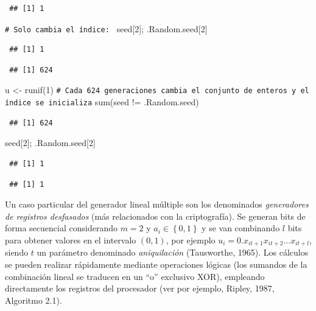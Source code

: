 \documentclass[
]{book}
\newenvironment{Shaded}{\begin{snugshade}}{\end{snugshade}}
\newcommand{\CommentTok}[1]{\textcolor[rgb]{0.56,0.35,0.01}{\textit{#1}}}
\newcommand{\DecValTok}[1]{\textcolor[rgb]{0.00,0.00,0.81}{#1}}
\newcommand{\FunctionTok}[1]{\textcolor[rgb]{0.00,0.00,0.00}{#1}}
\newcommand{\NormalTok}[1]{#1}
\newcommand{\OtherTok}[1]{\textcolor[rgb]{0.56,0.35,0.01}{#1}}
\newcommand{\SpecialCharTok}[1]{\textcolor[rgb]{0.00,0.00,0.00}{#1}}
\theoremstyle{break}
\theoremstyle{nonumberplain}
\renewcommand{\CommentTok}[1]{\textcolor[rgb]{0.41,0.41,0.41}{\texttt{#1}}}
\begin{document}
\begin{verbatim}
 ## [1] 1
\end{verbatim}

\begin{Shaded}
\begin{Highlighting}[]
\CommentTok{\# Solo cambia el índice: }
\NormalTok{seed[}\DecValTok{2}\NormalTok{]; .Random.seed[}\DecValTok{2}\NormalTok{]}
\end{Highlighting}
\end{Shaded}

\begin{verbatim}
 ## [1] 1
\end{verbatim}

\begin{verbatim}
 ## [1] 624
\end{verbatim}

\begin{Shaded}
\begin{Highlighting}[]
\NormalTok{u }\OtherTok{\textless{}{-}} \FunctionTok{runif}\NormalTok{(}\DecValTok{1}\NormalTok{)}
\CommentTok{\# Cada 624 generaciones cambia el conjunto de enteros y el índice se inicializa}
\FunctionTok{sum}\NormalTok{(seed }\SpecialCharTok{!=}\NormalTok{ .Random.seed)}
\end{Highlighting}
\end{Shaded}

\begin{verbatim}
 ## [1] 624
\end{verbatim}

\begin{Shaded}
\begin{Highlighting}[]
\NormalTok{seed[}\DecValTok{2}\NormalTok{]; .Random.seed[}\DecValTok{2}\NormalTok{]}
\end{Highlighting}
\end{Shaded}

\begin{verbatim}
 ## [1] 1
\end{verbatim}

\begin{verbatim}
 ## [1] 1
\end{verbatim}

Un caso particular del generador lineal múltiple son los denominados \emph{generadores de registros desfasados} (más relacionados con la criptografía).
Se generan bits de forma secuencial considerando \(m=2\) y \(a_{i} \in \left \{ 0,1\right \}\) y se van combinando \(l\) bits para obtener valores en el intervalo \((0, 1)\), por ejemplo \(u_i = 0 . x_{it+1} x_{it+2} \ldots x_{it+l}\), siendo \(t\) un parámetro denominado \emph{aniquilación} (Tausworthe, 1965).
Los cálculos se pueden realizar rápidamente mediante operaciones lógicas (los sumandos de la combinación lineal se traducen en un ``o'' exclusivo XOR), empleando directamente los registros del procesador (ver por ejemplo, Ripley, 1987, Algoritmo 2.1).
\end{document}
